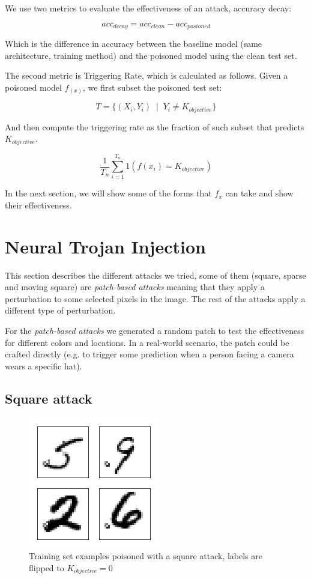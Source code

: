 \documentclass[letterpaper, 10 pt, conference]{ieeeconf}  %
\begin{document}
We use two metrics to evaluate the effectiveness of an attack, accuracy decay:

$$acc_{decay} = acc_{clean} - acc_{posioned}$$

Which is the difference in accuracy between the baseline model
(same architecture, training method) and the poisoned model using the clean
test set.

The second metric is Triggering Rate, which is calculated as follows. Given a poisoned model $f_(x)$, we
first subset the poisoned test set:

$$T = \{(X_i, Y_i) \;\;|\;\;Y_i  \neq K_{objective}\}$$

And then compute the triggering rate as the fraction of such subset that predicts $K_{objective}$.

$$\frac{1}{T_n} \sum_{i=1}^{T_n} 1(f(x_i) = K_{objective})$$

In the next section, we will show some of the forms that $f_x$ can take and show their effectiveness.


\section{Neural Trojan Injection}

This section describes the different attacks we tried, some of them (square,
sparse and moving square) are \textit{patch-based attacks} meaning that they
apply a perturbation to some selected pixels in the image. The rest of the
attacks apply a different type of perturbation.

For the \textit{patch-based attacks} we generated a random patch to test the
effectiveness for different colors and locations. In a real-world scenario, the patch could
be crafted directly (e.g. to trigger some prediction when a person facing a
camera wears a specific hat).

\subsection{Square attack}

\begin{figure}[h]
\centering
\includegraphics{square.png}
\caption{Training set examples poisoned with a square attack, labels are flipped to $K_{objective}=0$}
\end{figure}
\end{document}
